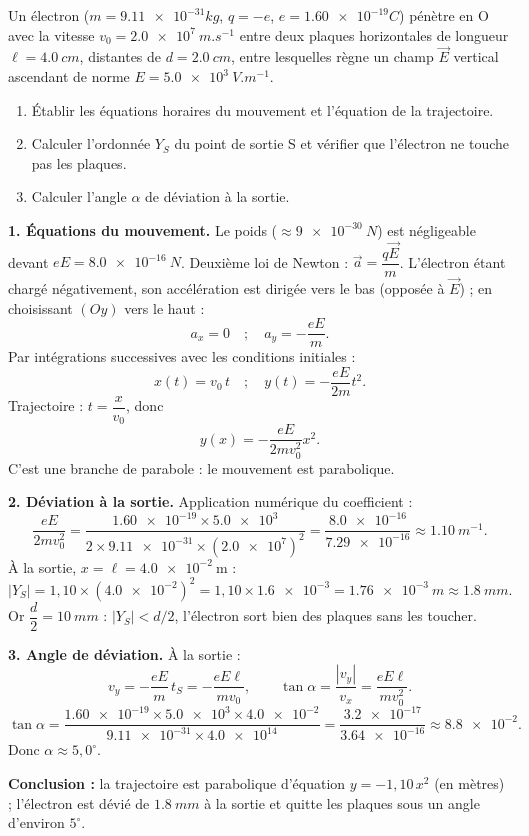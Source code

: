 \documentclass[11pt]{article}
\newcommand{\cle}[1]{{\popxbold\color{popdark}#1}}
\begin{document}
\begin{exoresolu}
Un électron ($m=\num{9,11e-31}{kg}$, $q=-e$, $e=\num{1,60e-19}{C}$) pénètre en O avec la vitesse $v_0=\SI{2,0e7}{m.s^{-1}}$ entre deux plaques horizontales de longueur $\ell=\SI{4,0}{cm}$, distantes de $d=\SI{2,0}{cm}$, entre lesquelles règne un champ $\vec{E}$ vertical ascendant de norme $E=\SI{5,0e3}{V.m^{-1}}$.
\begin{enumerate}
\item Établir les équations horaires du mouvement et l'équation de la trajectoire.
\item Calculer l'ordonnée $Y_S$ du point de sortie S et vérifier que l'électron ne touche pas les plaques.
\item Calculer l'angle $\alpha$ de déviation à la sortie.
\end{enumerate}
\tcblower
\textbf{1. Équations du mouvement.} Le poids ($\approx\SI{9e-30}{N}$) est négligeable devant $eE=\SI{8,0e-16}{N}$. Deuxième loi de Newton : $\vec{a}=\dfrac{q\vec{E}}{m}$. L'électron étant chargé négativement, son accélération est dirigée vers le bas (opposée à $\vec{E}$) ; en choisissant $(Oy)$ vers le haut :
\[ a_x=0 \quad ; \quad a_y=-\dfrac{eE}{m}. \]
Par intégrations successives avec les conditions initiales :
\[ x(t)=v_0\,t \quad ; \quad y(t)=-\dfrac{eE}{2m}t^2. \]
Trajectoire : $t=\dfrac{x}{v_0}$, donc
\[ y(x)=-\dfrac{eE}{2mv_0^2}x^2. \]
C'est une branche de parabole : le mouvement est \cle{parabolique}.

\textbf{2. Déviation à la sortie.} Application numérique du coefficient :
\[ \dfrac{eE}{2mv_0^2}=\dfrac{\num{1,60e-19}\times\num{5,0e3}}{2\times\num{9,11e-31}\times(\num{2,0e7})^2}
=\dfrac{\num{8,0e-16}}{\num{7,29e-16}}\approx\SI{1,10}{m^{-1}}. \]
À la sortie, $x=\ell=\num{4,0e-2}\ \mathrm{m}$ :
\[ |Y_S|=1{,}10\times(\num{4,0e-2})^2=1{,}10\times\num{1,6e-3}=\SI{1,76e-3}{m}\approx\SI{1,8}{mm}. \]
Or $\dfrac{d}{2}=\SI{10}{mm}$ : $|Y_S|<d/2$, l'électron sort bien des plaques sans les toucher.

\textbf{3. Angle de déviation.} À la sortie :
\[ v_y=-\dfrac{eE}{m}\,t_S=-\dfrac{eE\ell}{mv_0}, \qquad \tan\alpha=\dfrac{|v_y|}{v_x}=\dfrac{eE\ell}{mv_0^2}. \]
\[ \tan\alpha=\dfrac{\num{1,60e-19}\times\num{5,0e3}\times\num{4,0e-2}}{\num{9,11e-31}\times\num{4,0e14}}
=\dfrac{\num{3,2e-17}}{\num{3,64e-16}}\approx\num{8,8e-2}. \]
Donc $\alpha\approx 5,0^{\circ}$.

\textbf{Conclusion :} la trajectoire est parabolique d'équation $y=-1{,}10\,x^2$ (en mètres) ; l'électron est dévié de $\SI{1,8}{mm}$ à la sortie et quitte les plaques sous un angle d'environ $5^{\circ}$.
\end{exoresolu}
\end{document}
